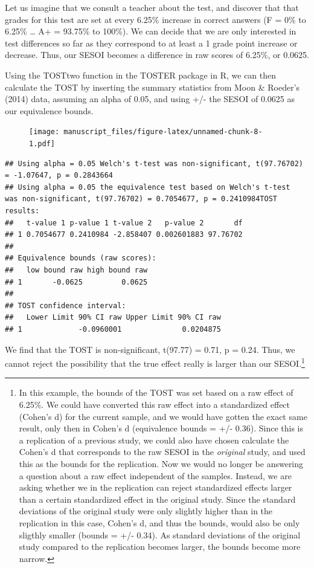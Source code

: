 \documentclass[english,man]{apa6}
\theoremstyle{definition}
\theoremstyle{definition}
\theoremstyle{definition}
\theoremstyle{remark}
\begin{document}
Let us imagine that we consult a teacher about the test, and discover
that that grades for this test are set at every 6.25\% increase in
correct answers (F = 0\% to 6.25\% \ldots{} A+ = 93.75\% to 100\%). We
can decide that we are only interested in test differences so far as
they correspond to at least a 1 grade point increase or decrease. Thus,
our SESOI becomes a difference in raw scores of 6.25\%, or 0.0625.

Using the TOSTtwo function in the TOSTER package in R, we can then
calculate the TOST by inserting the summary statistics from Moon \&
Roeder's (2014) data, assuming an alpha of 0.05, and using +/- the SESOI
of 0.0625 as our equivalence bounds.

\begin{figure}[htbp]
\centering
\texttt{[image: manuscript\_files/figure-latex/unnamed-chunk-8-1.pdf]}
\caption{}
\end{figure}

\begin{verbatim}
## Using alpha = 0.05 Welch's t-test was non-significant, t(97.76702) = -1.07647, p = 0.2843664
## Using alpha = 0.05 the equivalence test based on Welch's t-test  was non-significant, t(97.76702) = 0.7054677, p = 0.2410984TOST results:
##   t-value 1 p-value 1 t-value 2   p-value 2       df
## 1 0.7054677 0.2410984 -2.858407 0.002601883 97.76702
## 
## Equivalence bounds (raw scores):
##   low bound raw high bound raw
## 1       -0.0625         0.0625
## 
## TOST confidence interval:
##   Lower Limit 90% CI raw Upper Limit 90% CI raw
## 1             -0.0960001              0.0204875
\end{verbatim}

We find that the TOST is non-significant, t(97.77) = 0.71, p = 0.24.
Thus, we cannot reject the possibility that the true effect really is
larger than our SESOI.\footnote{In this example, the bounds of the TOST
  was set based on a raw effect of 6.25\%. We could have converted this
  raw effect into a standardized effect (Cohen's d) for the current
  sample, and we would have gotten the exact same result, only then in
  Cohen's d (equivalence bounds = +/- 0.36). Since this is a replication
  of a previous study, we could also have chosen calculate the Cohen's d
  that corresponds to the raw SESOI in the \emph{original} study, and
  used this as the bounds for the replication. Now we would no longer be
  answering a question about a raw effect independent of the samples.
  Instead, we are asking whether we in the replication can reject
  standardized effects larger than a certain standardized effect in the
  original study. Since the standard deviations of the original study
  were only slightly higher than in the replication in this case,
  Cohen's d, and thus the bounds, would also be only sligthly smaller
  (bounds = +/- 0.34). As standard deviations of the original study
  compared to the replication becomes larger, the bounds become more
  narrow.}
\end{document}
